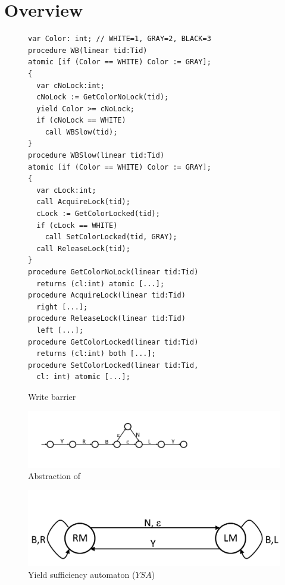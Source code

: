 \section{Overview}
\label{sec:overview}

\begin{figure} 
\begin{verbatim}
var Color: int; // WHITE=1, GRAY=2, BLACK=3
procedure WB(linear tid:Tid)
atomic [if (Color == WHITE) Color := GRAY];
{
  var cNoLock:int;
  cNoLock := GetColorNoLock(tid);
  yield Color >= cNoLock;
  if (cNoLock == WHITE) 
    call WBSlow(tid);
}
procedure WBSlow(linear tid:Tid)
atomic [if (Color == WHITE) Color := GRAY];
{
  var cLock:int;
  call AcquireLock(tid);
  cLock := GetColorLocked(tid);
  if (cLock == WHITE) 
    call SetColorLocked(tid, GRAY);
  call ReleaseLock(tid);
}
procedure GetColorNoLock(linear tid:Tid) 
  returns (cl:int) atomic [...];
procedure AcquireLock(linear tid:Tid) 
  right [...];
procedure ReleaseLock(linear tid:Tid) 
  left [...];
procedure GetColorLocked(linear tid:Tid) 
  returns (cl:int) both [...];
procedure SetColorLocked(linear tid:Tid, 
  cl: int) atomic [...];
\end{verbatim}
\caption{Write barrier}
\label{fig:reft}
\end{figure}

\begin{figure}
\begin{center}
\includegraphics[scale=0.35]{WBSlow.pdf}
\end{center}
\caption{Abstraction of }
\label{fig:midwb}
\end{figure}

\begin{figure}
\begin{center}
\includegraphics[scale=0.35]{YieldTypeCheckingAutomaton.pdf}
\end{center}
\caption{Yield sufficiency automaton ($YSA$)}
\label{fig:ysa}
\end{figure}

